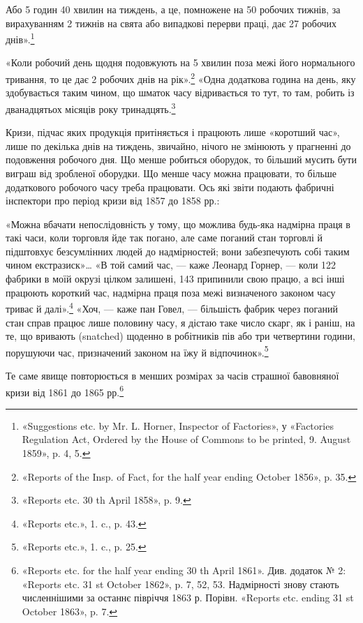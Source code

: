Або 5 годин 40 хвилин на тиждень, а це, помножене на 50
робочих тижнів, за вирахуванням 2 тижнів на свята або випадкові
перерви праці, дає 27 робочих днів».\footnote{
«Suggestions etc. by Mr. L. Horner, Inspector of Factories», у
«Factories Regulation Act, Ordered by the House of Commons to be printed,
9. August 1859», p. 4, 5.
}

«Коли робочий день щодня подовжують на 5 хвилин поза
межі його нормального тривання, то це дає 2 робочих днів на
рік».\footnote{
«Reports of the Insp. of Fact, for the half year ending October 1856»,
p. 35.
} «Одна додаткова година на день, яку здобувається таким
чином, що шматок часу відривається то тут, то там, робить із
дванадцятьох місяців року тринадцять.\footnote{
«Reports etc. 30 th April 1858», p. 9.
}

Кризи, підчас яких продукція притіняється і працюють лише
«коротший час», лише по декілька днів на тиждень, звичайно,
нічого не змінюють у прагненні до подовження робочого дня.
Що менше робиться оборудок, то більший мусить бути виграш
від зробленої оборудки. Що менше часу можна працювати, то
більше додаткового робочого часу треба працювати. Ось які
звіти подають фабричні інспектори про період кризи від 1857 до
1858 рр.:

«Можна вбачати непослідовність у тому, що можлива будь-яка
надмірна праця в такі часи, коли торговля йде так погано,
але саме поганий стан торговлі й підштовхує безсумлінних людей
до надмірностей; вони забезпечують собі таким чином екстразиск»\dots{}
«В той самий час, — каже Леонард Горнер, — коли
122 фабрики в моїй окрузі цілком залишені, 143 припинили свою
працю, а всі інші працюють короткий час, надмірна праця поза
межі визначеного законом часу триває й далі».\footnote{
«Reports etc.», 1. c., p. 43.
} «Хоч, — каже
пан Говел, — більшість фабрик через поганий стан справ працює
лише половину часу, я дістаю таке число скарг, як і раніш, на
те, що вривають (snatched) щоденно в робітників пів або три
четвертини години, порушуючи час, призначений законом на
їжу й відпочинок».\footnote{
«Reports etc.», 1. c., p. 25.
}

Те саме явище повторюється в менших розмірах за часів страшної
бавовняної кризи від 1861 до 1865 рр.\footnote{
«Reports etc. for the half year ending 30 th April 1861». Див. додаток
№ 2: «Reports etc. 31 st October 1862», p. 7, 52, 53. Надмірності знову
стають численнішими за останнє півріччя 1863 р. Порівн. «Reports etc.
ending 31 st October 1863», p. 7.
}

